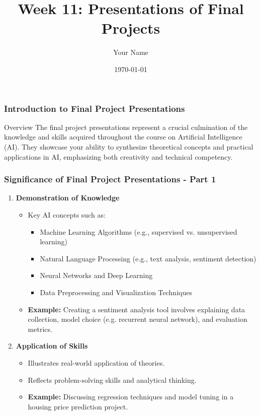 \documentclass{beamer}
\title{Week 11: Presentations of Final Projects}
\author{Your Name}
\institute{Your Institution}
\date{\today}
\begin{document}
\frame{\titlepage}

\begin{frame}[fragile]
    \frametitle{Introduction to Final Project Presentations}
    \begin{block}{Overview}
        The final project presentations represent a crucial culmination of the knowledge and skills acquired throughout the course on Artificial Intelligence (AI). They showcase your ability to synthesize theoretical concepts and practical applications in AI, emphasizing both creativity and technical competency.
    \end{block}
\end{frame}

\begin{frame}[fragile]
    \frametitle{Significance of Final Project Presentations - Part 1}
    \begin{enumerate}
        \item \textbf{Demonstration of Knowledge}
        \begin{itemize}
            \item Key AI concepts such as:
            \begin{itemize}
                \item Machine Learning Algorithms (e.g., supervised vs. unsupervised learning)
                \item Natural Language Processing (e.g., text analysis, sentiment detection)
                \item Neural Networks and Deep Learning
                \item Data Preprocessing and Visualization Techniques
            \end{itemize}
            \item \textbf{Example:} Creating a sentiment analysis tool involves explaining data collection, model choice (e.g. recurrent neural network), and evaluation metrics.
        \end{itemize}
        
        \item \textbf{Application of Skills}
        \begin{itemize}
            \item Illustrates real-world application of theories.
            \item Reflects problem-solving skills and analytical thinking.
            \item \textbf{Example:} Discussing regression techniques and model tuning in a housing price prediction project.
        \end{itemize}
    \end{enumerate}
\end{frame}
\end{document}
